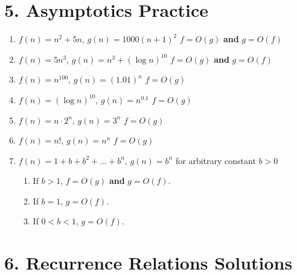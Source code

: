 \documentclass[11pt]{article}
\newenvironment{qparts}{\begin{enumerate}[{(}a{)}]}{\end{enumerate}}
\begin{document}
\newpage
\section*{5. Asymptotics Practice}

\begin{enumerate}

\item 
\( f(n) = n^2 + 5n \), \( g(n) = 1000(n+1)^2 \)
   \rightarrow \( f = O(g) \) \textbf{ and } \( g = O(f) \)

\item 
\( f(n) = 5n^3 \), \( g(n) = n^3 + (\log n)^{10} \)
   \rightarrow \( f = O(g) \) \textbf{ and } \( g = O(f) \)

\item 
\( f(n) = n^{100} \), \( g(n) = (1.01)^n \)
   \rightarrow \( f = O(g) \)

\item 
\( f(n) = (\log n)^{10} \), \( g(n) = n^{0.1} \)
   \rightarrow \( f = O(g) \)

\item 
\( f(n) = n \cdot 2^n \), \( g(n) = 3^n \)
   \rightarrow \( f = O(g) \)

\item 
\( f(n) = n! \), \( g(n) = n^n \)
   \rightarrow \( f = O(g) \)

\item 
\( f(n) = 1 + b + b^2 + \dots + b^n \), \( g(n) = b^n \) for arbitrary constant \( b > 0 \)
\begin{qparts}
\item If \( b > 1 \), \( f = O(g) \) \textbf{and} \( g = O(f) \).
\item If \( b = 1 \), \( g = O(f) \).
\item If \( 0 < b < 1 \), \( g = O(f) \).
\end{qparts}

\end{enumerate}



\newpage
\section*{6. Recurrence Relations Solutions}
\end{document}
